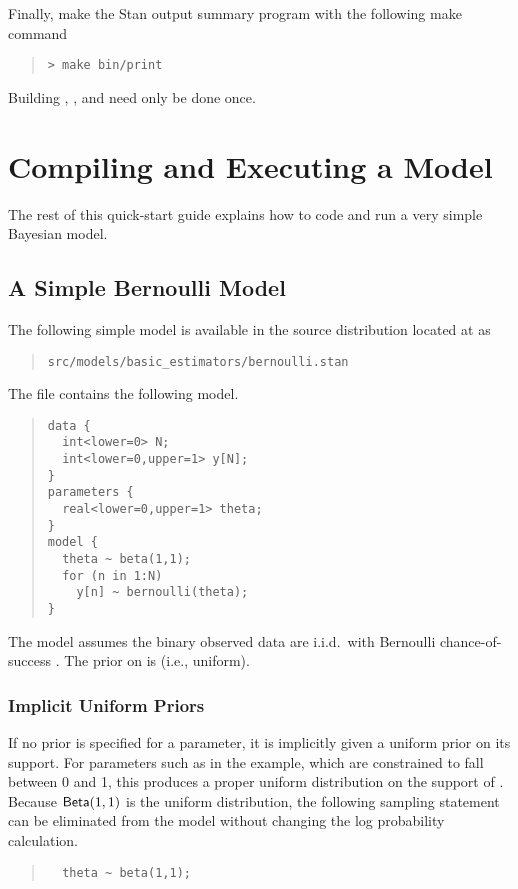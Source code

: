 Finally, make the Stan output summary program with the following
make command
%
\begin{quote}
\begin{Verbatim}[fontshape=sl]
> make bin/print
\end{Verbatim}
\end{quote}
%

Building , , and  need only be done once.

\section{Compiling and Executing a Model}

The rest of this quick-start guide explains how to code
and run a very simple Bayesian model.

\subsection{A Simple Bernoulli Model}

The following simple model is available in the source
distribution located at  as
%
\begin{quote}
\nolinkurl{src/models/basic_estimators/bernoulli.stan}
\end{quote}
%
The file contains the following model.
%
\begin{quote}
\begin{Verbatim}
data { 
  int<lower=0> N; 
  int<lower=0,upper=1> y[N];
} 
parameters {
  real<lower=0,upper=1> theta;
} 
model {
  theta ~ beta(1,1);
  for (n in 1:N) 
    y[n] ~ bernoulli(theta);
}
\end{Verbatim}
\end{quote}
%
The model assumes the binary observed data 
are i.i.d.\ with Bernoulli chance-of-success .  The
prior on  is  (i.e., uniform).

\subsubsection{Implicit Uniform Priors}

If no prior is specified for a parameter, it is implicitly given a
uniform prior on its support.  For parameters such as  in
the example, which are constrained to fall between 0 and 1, this
produces a proper uniform distribution on the support of .
Because $\mbox{\sf Beta}(1,1)$ is the uniform distribution, the
following sampling statement can be eliminated from the model without
changing the log probability calculation.
%
\begin{quote}
\begin{Verbatim}
  theta ~ beta(1,1);
\end{Verbatim}
\end{quote}


